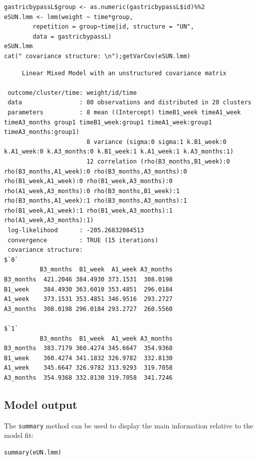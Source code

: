 \documentclass[12pt]{article}
\begin{document}
\lstset{language=r,label= ,caption= ,captionpos=b,numbers=none}
\begin{lstlisting}
gastricbypassL$group <- as.numeric(gastricbypassL$id)%%2
eSUN.lmm <- lmm(weight ~ time*group,
		repetition = group~time|id, structure = "UN",
		data = gastricbypassL)
eSUN.lmm
cat(" covariance structure: \n");getVarCov(eSUN.lmm)
\end{lstlisting}

\begin{verbatim}
     Linear Mixed Model with an unstructured covariance matrix 

 outcome/cluster/time: weight/id/time 
 data                : 80 observations and distributed in 20 clusters 
 parameters          : 8 mean ((Intercept) timeB1_week timeA1_week timeA3_months group1 timeB1_week:group1 timeA1_week:group1 timeA3_months:group1) 
                       8 variance (sigma:0 sigma:1 k.B1_week:0 k.A1_week:0 k.A3_months:0 k.B1_week:1 k.A1_week:1 k.A3_months:1) 
                       12 correlation (rho(B3_months,B1_week):0 rho(B3_months,A1_week):0 rho(B3_months,A3_months):0 rho(B1_week,A1_week):0 rho(B1_week,A3_months):0 rho(A1_week,A3_months):0 rho(B3_months,B1_week):1 rho(B3_months,A1_week):1 rho(B3_months,A3_months):1 rho(B1_week,A1_week):1 rho(B1_week,A3_months):1 rho(A1_week,A3_months):1) 
 log-likelihood      : -205.26832084513 
 convergence         : TRUE (15 iterations)
 covariance structure: 
$`0`
          B3_months  B1_week  A1_week A3_months
B3_months  421.2046 384.4930 373.1531  308.0198
B1_week    384.4930 363.6010 353.4851  296.0184
A1_week    373.1531 353.4851 346.9516  293.2727
A3_months  308.0198 296.0184 293.2727  260.5560

$`1`
          B3_months  B1_week  A1_week A3_months
B3_months  383.7179 360.4274 345.6647  354.9368
B1_week    360.4274 341.1832 326.9782  332.8130
A1_week    345.6647 326.9782 313.9293  319.7058
A3_months  354.9368 332.8130 319.7058  341.7246
\end{verbatim}

\clearpage
\subsection{Model output}
\label{sec:org9db32d3}

The \texttt{summary} method can be used to display the main information
relative to the model fit:
\lstset{language=r,label= ,caption= ,captionpos=b,numbers=none}
\begin{lstlisting}
summary(eUN.lmm)
\end{lstlisting}
\end{document}
